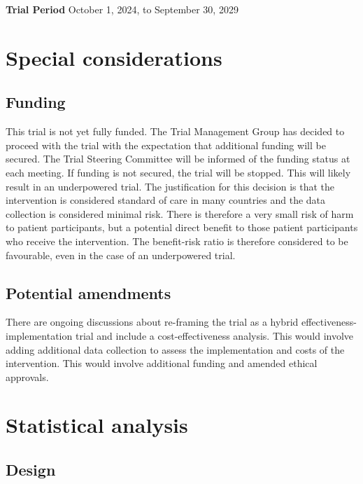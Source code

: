 \documentclass[
]{scrartcl}
\begin{document}
\textbf{Trial Period} October 1, 2024, to September 30, 2029

\newpage{}

\hypertarget{special-considerations}{%
\section{Special considerations}\label{special-considerations}}

\hypertarget{funding}{%
\subsection{Funding}\label{funding}}

This trial is not yet fully funded. The Trial Management Group has
decided to proceed with the trial with the expectation that additional
funding will be secured. The Trial Steering Committee will be informed
of the funding status at each meeting. If funding is not secured, the
trial will be stopped. This will likely result in an underpowered trial.
The justification for this decision is that the intervention is
considered standard of care in many countries and the data collection is
considered minimal risk. There is therefore a very small risk of harm to
patient participants, but a potential direct benefit to those patient
participants who receive the intervention. The benefit-risk ratio is
therefore considered to be favourable, even in the case of an
underpowered trial.

\hypertarget{potential-amendments}{%
\subsection{Potential amendments}\label{potential-amendments}}

There are ongoing discussions about re-framing the trial as a hybrid
effectiveness-implementation trial and include a cost-effectiveness
analysis. This would involve adding additional data collection to assess
the implementation and costs of the intervention. This would involve
additional funding and amended ethical approvals.

\newpage{}

\hypertarget{statistical-analysis}{%
\section{Statistical analysis}\label{statistical-analysis}}

\hypertarget{design}{%
\subsection{Design}\label{design}}
\end{document}
